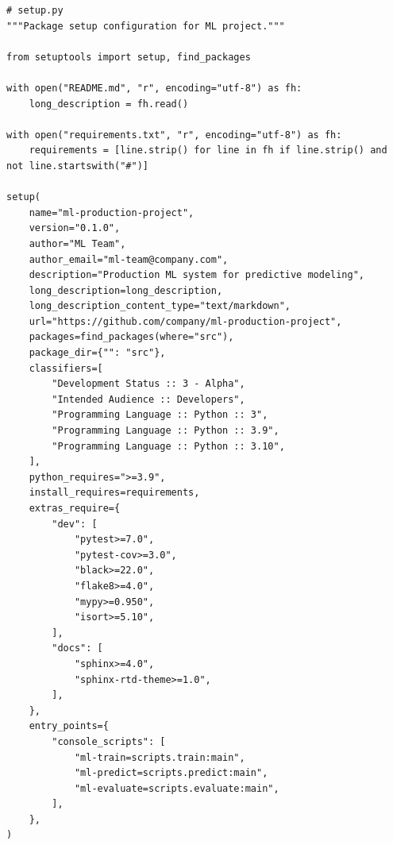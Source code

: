 \begin{lstlisting}[style=python, caption=Setup configuration for package installation]
# setup.py
"""Package setup configuration for ML project."""

from setuptools import setup, find_packages

with open("README.md", "r", encoding="utf-8") as fh:
    long_description = fh.read()

with open("requirements.txt", "r", encoding="utf-8") as fh:
    requirements = [line.strip() for line in fh if line.strip() and not line.startswith("#")]

setup(
    name="ml-production-project",
    version="0.1.0",
    author="ML Team",
    author_email="ml-team@company.com",
    description="Production ML system for predictive modeling",
    long_description=long_description,
    long_description_content_type="text/markdown",
    url="https://github.com/company/ml-production-project",
    packages=find_packages(where="src"),
    package_dir={"": "src"},
    classifiers=[
        "Development Status :: 3 - Alpha",
        "Intended Audience :: Developers",
        "Programming Language :: Python :: 3",
        "Programming Language :: Python :: 3.9",
        "Programming Language :: Python :: 3.10",
    ],
    python_requires=">=3.9",
    install_requires=requirements,
    extras_require={
        "dev": [
            "pytest>=7.0",
            "pytest-cov>=3.0",
            "black>=22.0",
            "flake8>=4.0",
            "mypy>=0.950",
            "isort>=5.10",
        ],
        "docs": [
            "sphinx>=4.0",
            "sphinx-rtd-theme>=1.0",
        ],
    },
    entry_points={
        "console_scripts": [
            "ml-train=scripts.train:main",
            "ml-predict=scripts.predict:main",
            "ml-evaluate=scripts.evaluate:main",
        ],
    },
)
\end{lstlisting}

